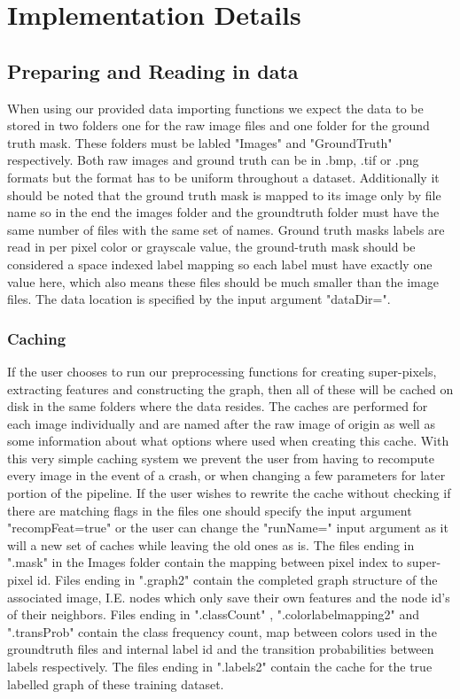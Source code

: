 
%
%
%
%
%
%
%
\chapter{Implementation Details }
\section{Preparing and Reading in data}
When using our provided data importing functions we expect the data to be stored in two folders one for the raw image files and one folder for the ground truth mask. These folders must be labled "Images" and "GroundTruth" respectively. Both raw images and ground truth can be in .bmp, .tif or .png formats but the format has to be uniform throughout a dataset. Additionally it should be noted that the ground truth mask is mapped to its image only by file name so in the end the images folder and the groundtruth folder must have the same number of files with the same set of names. Ground truth masks labels are read in per pixel color or grayscale value, the ground-truth mask should be considered a space indexed label mapping so each label must have exactly one value here, which also means these files should be much smaller than the image files. The data location is specified by the input argument "dataDir=".
\subsection{Caching}
If the user chooses to run our preprocessing functions for creating super-pixels, extracting features and constructing the graph, then all of these will be cached on disk in the same folders where the data resides. The caches are performed for each image individually and are named after the raw image of origin as well as some information about what options where used when creating this cache. With this very simple caching system we prevent the user from having to recompute every image in the event of a crash, or when changing a few parameters for later portion of the pipeline. If the user wishes to rewrite the cache without checking if there are matching flags in the files one should specify the input argument "recompFeat=true" or the user can change the "runName=" input argument as it will a new set of caches while leaving the old ones as is. The files ending in ".mask" in the Images folder contain the mapping between pixel index to super-pixel id. Files ending in ".graph2" contain the completed graph structure of the associated image, I.E. nodes which only save their own features and the node id's of their neighbors. Files ending in ".classCount" , ".colorlabelmapping2" and ".transProb" contain the class frequency count, map between colors used in the groundtruth files and internal label id and the transition probabilities between labels respectively. The files ending in ".labels2" contain the cache for the true labelled graph of these training dataset. 



